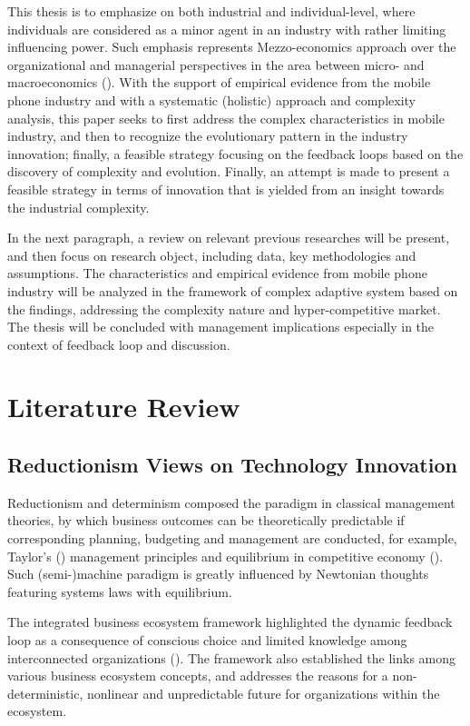 \documentclass[utf8,english]{gradu3}
\begin{document}
This thesis is to emphasize on both industrial and individual-level, where individuals are considered as a minor agent in an industry with rather limiting influencing power. Such emphasis represents Mezzo-economics approach over the organizational and managerial perspectives in the area between micro- and macroeconomics (\cite{kozuharov2011mezzo}). With the support of empirical evidence from the mobile phone industry and with a systematic (holistic) approach and complexity analysis, this paper seeks to first address the complex characteristics in mobile industry, and then to recognize the evolutionary pattern in the industry innovation; finally, a feasible strategy focusing on the feedback loops based on the discovery of complexity and evolution. Finally, an attempt is made to present a feasible strategy in terms of innovation that is yielded from an insight towards the industrial complexity. 

In the next paragraph, a review on relevant previous researches will be present, and then focus on research object, including data, key methodologies and assumptions. The characteristics and empirical evidence from mobile phone industry will be analyzed in the framework of complex adaptive system based on the findings, addressing the complexity nature and hyper-competitive market. The thesis will be concluded with management implications especially in the context of feedback loop and discussion.

\chapter{Literature Review}

\section{Reductionism Views on Technology Innovation}

Reductionism and determinism composed the paradigm in classical management theories, by which business outcomes can be theoretically predictable if corresponding planning, budgeting and management are conducted, for example, Taylor's (\citeyear{taylor1911shop}) management principles and equilibrium in competitive economy (\cite{arrow1954existence}). Such (semi-)machine paradigm is greatly influenced by Newtonian thoughts featuring systems laws with equilibrium.

The integrated business ecosystem framework highlighted the dynamic feedback loop as a consequence of conscious choice and limited knowledge among interconnected organizations (\cite{peltoniemi2006preliminary}). The framework also established the links among various business ecosystem concepts, and addresses the reasons for a non-deterministic, nonlinear and unpredictable future for organizations within the ecosystem.
\end{document}

